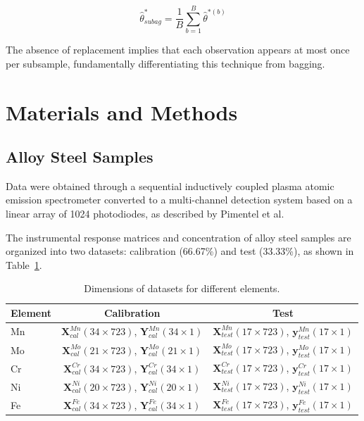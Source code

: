 \documentclass[12pt]{article}
\begin{document}
\begin{equation}
\hat{\theta}^*_{subag} = \frac{1}{B}\sum_{b=1}^{B}\hat{\theta}^{*(b)}
\end{equation}

The absence of replacement implies that each observation appears at most once per subsample, fundamentally differentiating this technique from bagging.\cite{Revelas:2024,Qin:2023,Galvao:2006}

\section{Materials and Methods}

\subsection{Alloy Steel Samples}

Data were obtained through a sequential inductively coupled plasma atomic emission spectrometer converted to a multi-channel detection system based on a linear array of 1024 photodiodes, as described by Pimentel et al.\cite{Pimentel:1998}

The instrumental response matrices and concentration of alloy steel samples are organized into two datasets: calibration (66.67\%) and test (33.33\%), as shown in Table~\ref{tab:dimensions}.

\begin{table}[H]
\centering
\caption{Dimensions of datasets for different elements.}
\label{tab:dimensions}
\begin{tabular}{lcc}
\toprule
Element & Calibration & Test \\
\midrule
Mn & $\mathbf{X}_{cal}^{Mn}(34\times723)$, $\mathbf{Y}_{cal}^{Mn}(34\times1)$ & $\mathbf{X}_{test}^{Mn}(17\times723)$, $\mathbf{y}_{test}^{Mn}(17\times1)$ \\
Mo & $\mathbf{X}_{cal}^{Mo}(21\times723)$, $\mathbf{Y}_{cal}^{Mo}(21\times1)$ & $\mathbf{X}_{test}^{Mo}(17\times723)$, $\mathbf{y}_{test}^{Mo}(17\times1)$ \\
Cr & $\mathbf{X}_{cal}^{Cr}(34\times723)$, $\mathbf{Y}_{cal}^{Cr}(34\times1)$ & $\mathbf{X}_{test}^{Cr}(17\times723)$, $\mathbf{y}_{test}^{Cr}(17\times1)$ \\
Ni & $\mathbf{X}_{cal}^{Ni}(20\times723)$, $\mathbf{Y}_{cal}^{Ni}(20\times1)$ & $\mathbf{X}_{test}^{Ni}(17\times723)$, $\mathbf{y}_{test}^{Ni}(17\times1)$ \\
Fe & $\mathbf{X}_{cal}^{Fe}(34\times723)$, $\mathbf{Y}_{cal}^{Fe}(34\times1)$ & $\mathbf{X}_{test}^{Fe}(17\times723)$, $\mathbf{y}_{test}^{Fe}(17\times1)$ \\
\bottomrule
\end{tabular}
\end{table}
\end{document}

